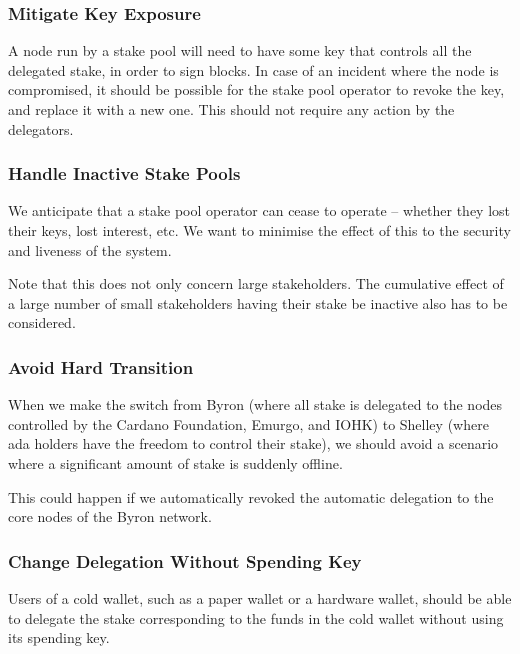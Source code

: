 \documentclass[11pt,a4paper,dvipsnames,twosided]{article}
\begin{document}
\subsubsection{Mitigate Key Exposure}
\label{mitigate-key-exposure}

A node run by a stake pool will need to have some key that controls all
the delegated stake, in order to sign blocks. In case of an incident
where the node is compromised, it should be possible for the stake pool
operator to revoke the key, and replace it with a new one. This should
not require any action by the delegators.

\subsubsection{Handle Inactive Stake Pools}
\label{handle-inactive-stake-pools}

We anticipate that a stake pool operator can cease to operate -- whether
they lost their keys, lost interest, etc. We want to minimise the
effect of this to the security and liveness of the system.


Note that this does not only concern large stakeholders. The cumulative effect
of a large number of small stakeholders having their stake be inactive also has
to be considered.


\subsubsection{Avoid Hard Transition}
\label{avoid-hard-transition}

When we make the switch from Byron (where all stake is delegated to the
nodes controlled by the Cardano Foundation, Emurgo, and IOHK) to Shelley
(where ada holders have the freedom to control their stake), we should
avoid a scenario where a significant amount of stake is suddenly
offline.

This could happen if we automatically revoked the automatic delegation
to the core nodes of the Byron network.

\subsubsection{Change Delegation Without Spending Key}
\label{change-delegation-without-spending-key}

Users of a cold wallet, such as a paper wallet or a hardware wallet,
should be able to delegate the stake corresponding to the funds in the
cold wallet without using its spending key.
\end{document}
